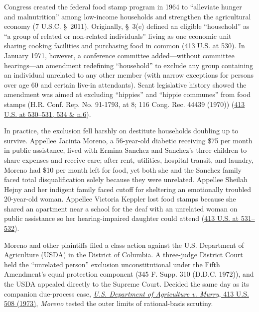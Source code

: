 \documentclass[12pt]{article}
\begin{document}
Congress created the federal food stamp program in 1964 to ``alleviate hunger and malnutrition'' among low-income households and strengthen the agricultural economy (7 U.S.C. \S~2011). Originally, \S~3(e) defined an eligible ``household'' as ``a group of related or non-related individuals'' living as one economic unit sharing cooking facilities and purchasing food in common (\href{https://supreme.justia.com/cases/federal/us/413/528/}{413 U.S. at 530}). In January 1971, however, a conference committee added---without committee hearings---an amendment redefining ``household'' to exclude any group containing an individual unrelated to any other member (with narrow exceptions for persons over age 60 and certain live-in attendants). Scant legislative history showed the amendment was aimed at excluding ``hippies'' and ``hippie communes'' from food stamps (H.R. Conf. Rep. No. 91-1793, at 8; 116 Cong. Rec. 44439 (1970)) (\href{https://supreme.justia.com/cases/federal/us/413/528/}{413 U.S. at 530--531, 534 \& n.6}).

In practice, the exclusion fell harshly on destitute households doubling up to survive. Appellee Jacinta Moreno, a 56-year-old diabetic receiving \$75 per month in public assistance, lived with Ermina Sanchez and Sanchez's three children to share expenses and receive care; after rent, utilities, hospital transit, and laundry, Moreno had \$10 per month left for food, yet both she and the Sanchez family faced total disqualification solely because they were unrelated. Appellee Sheilah Hejny and her indigent family faced cutoff for sheltering an emotionally troubled 20-year-old woman. Appellee Victoria Keppler lost food stamps because she shared an apartment near a school for the deaf with an unrelated woman on public assistance so her hearing-impaired daughter could attend (\href{https://supreme.justia.com/cases/federal/us/413/528/}{413 U.S. at 531--532}).

Moreno and other plaintiffs filed a class action against the U.S. Department of Agriculture (USDA) in the District of Columbia. A three-judge District Court held the ``unrelated person'' exclusion unconstitutional under the Fifth Amendment's equal protection component (345 F. Supp. 310 (D.D.C. 1972)), and the USDA appealed directly to the Supreme Court. Decided the same day as its companion due-process case, \href{https://supreme.justia.com/cases/federal/us/413/508/}{\textit{U.S. Department of Agriculture v. Murry}, 413 U.S. 508 (1973)}, \textit{Moreno} tested the outer limits of rational-basis scrutiny.
\end{document}
